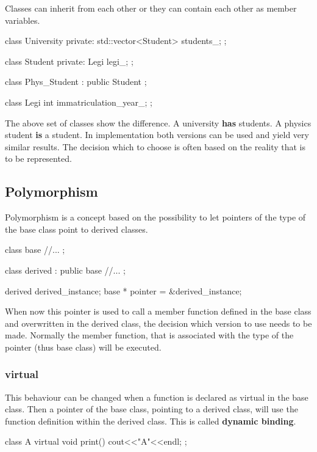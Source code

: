 \documentclass[10pt,a4paper]{scrartcl}
\begin{document}
\begin{multicols*}{2}
Classes can inherit from each other or they can contain each other as member variables.

\begin{TPCpp}
class University {
private:
	std::vector<Student> students_;
};

class Student {
private:
	Legi legi_;
};

class Phys_Student : public Student {};

class Legi {
	int immatriculation_year_;
};
\end{TPCpp}

The above set of classes show the difference. A university \textbf{has} students. A physics student \textbf{is} a student. In implementation both versions can be used and yield very similar results. The decision which to choose is often based on the reality that is to be represented.

\subsection{Polymorphism}
\label{sec:Polymorphism}

Polymorphism is a concept based on the possibility to let pointers of the type of the base class point to derived classes.

\begin{TPCpp}
class base {
	//...
};

class derived : public base {
	//...
};

derived derived_instance;
base * pointer = &derived_instance;
\end{TPCpp}

When now this pointer is used to call a member function defined in the base class and overwritten in the derived class, the decision which version to use needs to be made. Normally the member function, that is associated with the type of the pointer (thus base class) will be executed.

\subsubsection{virtual}
\label{sec:virtual}

This behaviour can be changed when a function is declared as virtual in the base class. Then a pointer of the base class, pointing to a derived class, will use the function definition within the derived class. This is called \textbf{dynamic binding}.

\begin{TPCpp}
class A {
	virtual void print() 
	{cout<<"A"<<endl;}
};


\end{TPCpp}
\end{multicols*}
\end{document}
